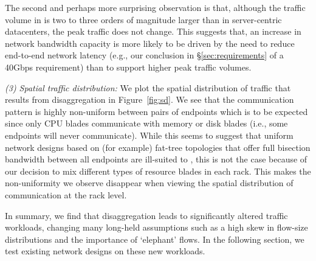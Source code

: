 The second and perhaps more surprising observation is that, although the traffic volume in \dis is two to three orders of magnitude larger than in server-centric datacenters, the peak traffic does not change. 
This suggests that, an increase in \dis network bandwidth capacity is more likely to be driven by the need to reduce end-to-end network latency (e.g., our conclusion in  \S\ref{sec:requirements} of a 40Gbps requirement) than to support higher peak traffic volumes.



\noindent \emph{(3) Spatial traffic distribution:}
We plot the spatial distribution of traffic that results from disaggregation in Figure~\ref{fig:sd}. 
We see that the communication pattern is highly non-uniform between pairs of endpoints which is to be expected since only CPU blades communicate with memory or disk blades (i.e., some endpoints 
will never communicate). While this seems to suggest that uniform network designs based on (for example) fat-tree topologies that offer full bisection bandwidth between all endpoints are ill-suited to \dis, this is not the case because of our decision to mix different types of resource blades in each rack. This makes the non-uniformity we observe disappear when viewing the spatial distribution of communication at the rack level. 

 In summary, we find that disaggregation leads to significantly altered traffic workloads, changing many long-held assumptions such as a high skew in flow-size distributions and the importance of `elephant' flows. In the following section, we test existing network designs on these new workloads.



